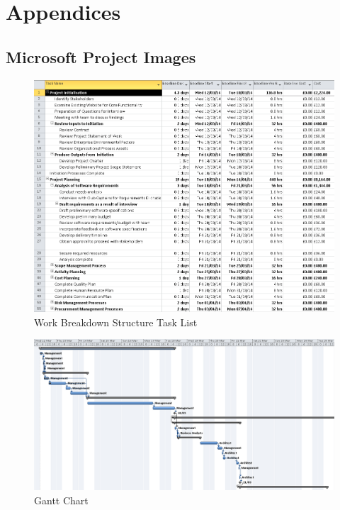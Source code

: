 \chapter{Appendices}
\label{appendices}
\section{Microsoft Project Images}

\begin{figure}[H]
\begin{center}
\includegraphics[width=14cm]{wbs1.png}
\end{center}
\caption{Work Breakdown Structure Task List}
\label{fig:letter}
\end{figure}

\begin{figure}[H]
\begin{center}
\includegraphics[width=23cm, angle=90]{wbs2.png}
\end{center}
\caption{Gantt Chart }
\label{fig:letter}
\end{figure}

